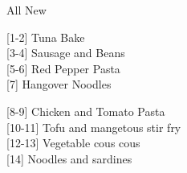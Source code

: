 		\begin{menu}{All New}
    
    \begin{recipelist}
    
        {\scriptsize[1-2]} Tuna Bake\\
        {\scriptsize[3-4]} Sausage and Beans\\
        {\scriptsize[5-6]} Red Pepper Pasta\\
        {\scriptsize[7]} Hangover Noodles\\%
    \end{recipelist}%
    \begin{recipelist}
    
        {\scriptsize[8-9]} Chicken and Tomato Pasta\\
        {\scriptsize[10-11]} Tofu and mangetous stir fry\\
        {\scriptsize[12-13]} Vegetable cous cous\\
        {\scriptsize[14]} Noodles and sardines\\%
    \end{recipelist}\par%
  

\end{menu}
